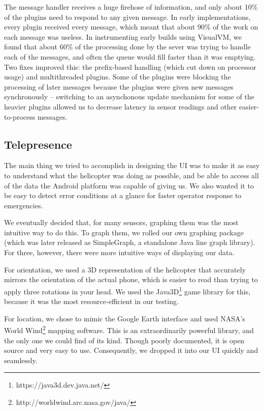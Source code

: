 \documentclass[letterpaper]{article}
\begin{document}
The message handler receives a huge firehose of information, and only
about 10\% of the plugins need to respond to any given message. In
early implementations, every plugin received every message, which
meant that about 90\% of the work on each message was useless. In
instrumenting early builds using VisualVM, we found that about 60\% of
the processing done by the sever was trying to handle each of the
messages, and often the queue would fill faster than it was
emptying. Two fixes improved this: the prefix-based handling (which
cut down on processor usage) and multithreaded plugins. Some of the
plugins were blocking the processing of later messages because the
plugins were given new messages synchronously -- switching to an
asynchonous update mechanism for some of the heavier plugins allowed
us to decrease latency in sensor readings and other easier-to-process
messages.

\subsection{Telepresence}
The main thing we tried to accomplish in designing the UI was to make
it as easy to understand what the helicopter was doing as possible,
and be able to access all of the data the Android platform was capable
of giving us. We also wanted it to be easy to detect error conditions
at a glance for faster operator response to emergencies.

We eventually decided that, for many sensors, graphing them was the
most intuitive way to do this. To graph them, we rolled our own
graphing package (which was later released as SimpleGraph, a standalone
Java line graph library). For three, however, there were more
intuitive ways of displaying our data. 

For orientation, we used a 3D representation of the helicopter that
accurately mirrors the orientation of the actual phone, which is
easier to read than trying to apply three rotations in your head. We
used the Java3D\footnote{https://java3d.dev.java.net/} game library
for this, because it was the most resource-efficient in our testing. 

For location, we chose to mimic the Google Earth interface and used
NASA's World Wind\footnote{http://worldwind.arc.nasa.gov/java/}
mapping software. This is an extraordinarily powerful library, and the
only one we could find of its kind. Though poorly documented, it is open
source and very easy to use.  Consequently, we dropped it into our UI
quickly and seamlessly. 
\end{document}
